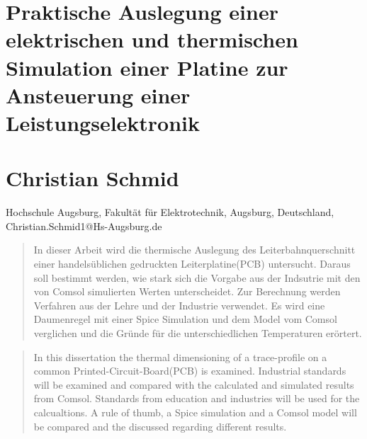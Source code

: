 \documentclass[10pt,a4paper,oneside,abstracton]{scrartcl}
\begin{document}
\section*{Praktische Auslegung einer elektrischen und thermischen Simulation einer Platine zur Ansteuerung einer Leistungselektronik}
\section*{Christian Schmid}
Hochschule Augsburg, Fakultät für Elektrotechnik, Augsburg, Deutschland, Christian.Schmid1@Hs-Augsburg.de 


\begin{abstract} %
\noindent %
In dieser Arbeit wird die thermische Auslegung des Leiterbahnquerschnitt einer handelsüblichen gedruckten Leiterplatine(PCB) untersucht. 
Daraus soll bestimmt werden, wie stark sich die Vorgabe aus der Indsutrie mit den von Comsol simulierten Werten unterscheidet. 
Zur Berechnung werden Verfahren aus der Lehre und der Industrie verwendet. 
Es wird eine Daumenregel mit einer Spice Simulation und dem Model vom Comsol verglichen und die Gründe für die 
unterschiedlichen Temperaturen erörtert. 
\end{abstract}

\renewcommand{\abstractname}{Abstract} %

\begin{abstract}
\noindent %
In this dissertation the thermal dimensioning  of a trace-profile on a  common Printed-Circuit-Board(PCB) is examined.
Industrial standards will be examined and compared with the calculated and simulated results from Comsol.
Standards from education and industries will be used for the calcualtions.  
A rule of thumb, a Spice simulation and a Comsol model will be compared and the discussed regarding different results. 
\end{abstract}
\end{document}
